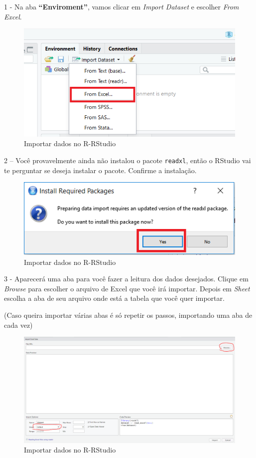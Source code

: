 \documentclass[
]{book}
\begin{document}
1 - Na aba \textbf{``Enviroment''}, vamos clicar em \emph{Import
Dataset} e escolher \emph{From Excel}.

\begin{figure}
\centering
\includegraphics{imagens/5_excel1.png}
\caption{Importar dados no R-RStudio}
\end{figure}

2 -- Você provavelmente ainda não instalou o pacote \texttt{readxl},
então o RStudio vai te perguntar se deseja instalar o pacote. Confirme a
instalação.

\begin{figure}
\centering
\includegraphics{imagens/5_excel2.png}
\caption{Importar dados no R-RStudio}
\end{figure}

3 - Aparecerá uma aba para você fazer a leitura dos dados desejados.
Clique em \emph{Browse} para escolher o arquivo de Excel que você irá
importar. Depois em \emph{Sheet} escolha a aba de seu arquivo onde está
a tabela que você quer importar.

(Caso queira importar várias abas é só repetir os passos, importando uma
aba de cada vez)

\begin{figure}
\centering
\includegraphics{imagens/5_excel3.png}
\caption{Importar dados no R-RStudio}
\end{figure}
\end{document}
